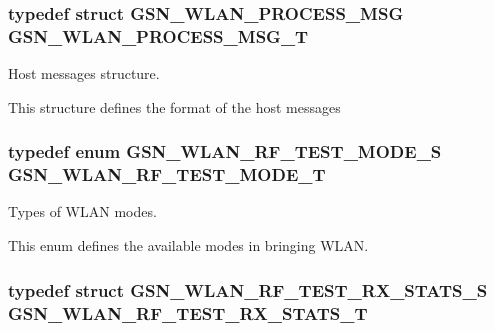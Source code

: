 \label{a00677_ga07d4ca8f04e21011d1e7b071ee2b376a}
\hypertarget{a00677_gaabf8bae549f7aca1d1a07fbc8f2d4459}{
\subsubsection[{GSN\_\-WLAN\_\-PROCESS\_\-MSG\_\-T}]{\setlength{\rightskip}{0pt plus 5cm}typedef struct {\bf GSN\_\-WLAN\_\-PROCESS\_\-MSG} {\bf GSN\_\-WLAN\_\-PROCESS\_\-MSG\_\-T}}}
\label{a00677_gaabf8bae549f7aca1d1a07fbc8f2d4459}


Host messages structure. 

This structure defines the format of the host messages \hypertarget{a00677_ga05896005da162a0b0f4b304f7c551947}{
\subsubsection[{GSN\_\-WLAN\_\-RF\_\-TEST\_\-MODE\_\-T}]{\setlength{\rightskip}{0pt plus 5cm}typedef enum {\bf GSN\_\-WLAN\_\-RF\_\-TEST\_\-MODE\_\-S} {\bf GSN\_\-WLAN\_\-RF\_\-TEST\_\-MODE\_\-T}}}
\label{a00677_ga05896005da162a0b0f4b304f7c551947}


Types of WLAN modes. 

This enum defines the available modes in bringing WLAN. \hypertarget{a00677_ga150fdf6ec3c7c370b27651412b36653a}{
\subsubsection[{GSN\_\-WLAN\_\-RF\_\-TEST\_\-RX\_\-STATS\_\-T}]{\setlength{\rightskip}{0pt plus 5cm}typedef struct {\bf GSN\_\-WLAN\_\-RF\_\-TEST\_\-RX\_\-STATS\_\-S} {\bf GSN\_\-WLAN\_\-RF\_\-TEST\_\-RX\_\-STATS\_\-T}}}
\label{a00677_ga150fdf6ec3c7c370b27651412b36653a}



